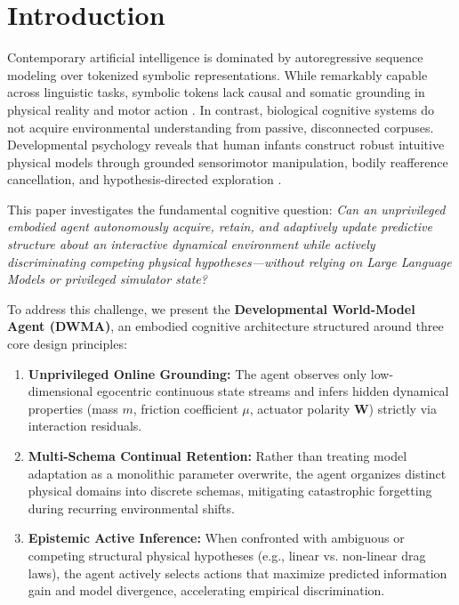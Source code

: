 \documentclass[preprint,12pt]{elsarticle}
\begin{document}
\section{Introduction}
\label{sec:intro}
Contemporary artificial intelligence is dominated by autoregressive sequence modeling over tokenized symbolic representations. While remarkably capable across linguistic tasks, symbolic tokens lack causal and somatic grounding in physical reality and motor action \citep{harnad1990,brooks1991,bender2020}. In contrast, biological cognitive systems do not acquire environmental understanding from passive, disconnected corpuses. Developmental psychology reveals that human infants construct robust intuitive physical models through grounded sensorimotor manipulation, bodily reafference cancellation, and hypothesis-directed exploration \citep{piaget1952,vonholst1950,friston2010,gopnik2012}.

This paper investigates the fundamental cognitive question: \textit{Can an unprivileged embodied agent autonomously acquire, retain, and adaptively update predictive structure about an interactive dynamical environment while actively discriminating competing physical hypotheses---without relying on Large Language Models or privileged simulator state?}

To address this challenge, we present the \textbf{Developmental World-Model Agent (DWMA)}, an embodied cognitive architecture structured around three core design principles:
\begin{enumerate}
    \item \textbf{Unprivileged Online Grounding:} The agent observes only low-dimensional egocentric continuous state streams and infers hidden dynamical properties (mass $m$, friction coefficient $\mu$, actuator polarity $\mathbf{W}$) strictly via interaction residuals.
    \item \textbf{Multi-Schema Continual Retention:} Rather than treating model adaptation as a monolithic parameter overwrite, the agent organizes distinct physical domains into discrete schemas, mitigating catastrophic forgetting during recurring environmental shifts.
    \item \textbf{Epistemic Active Inference:} When confronted with ambiguous or competing structural physical hypotheses (e.g., linear vs. non-linear drag laws), the agent actively selects actions that maximize predicted information gain and model divergence, accelerating empirical discrimination.
\end{enumerate}
\end{document}
